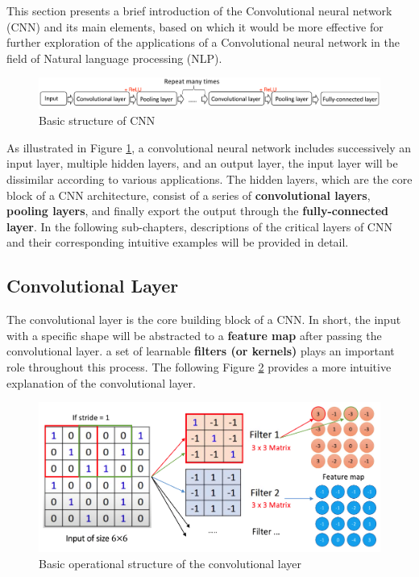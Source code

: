 \documentclass[]{krantz}
\begin{document}
This section presents a brief introduction of the Convolutional neural network (CNN) and its main elements, based on which it would be more effective for further exploration of the applications of a Convolutional neural network in the field of Natural language processing (NLP).

\begin{figure}[ht]

{\centering \includegraphics[width=1.05\linewidth]{figures/01-03-cnns-and-their-applications-in-nlp/basic_structure} 

}

\caption{Basic structure of CNN}\label{fig:figs}
\end{figure}

As illustrated in Figure \ref{fig:figs}, a convolutional neural network includes successively an input layer, multiple hidden layers, and an output layer, the input layer will be dissimilar according to various applications. The hidden layers, which are the core block of a CNN architecture, consist of a series of \textbf{convolutional layers}, \textbf{pooling layers}, and finally export the output through the \textbf{fully-connected layer}. In the following sub-chapters, descriptions of the critical layers of CNN and their corresponding intuitive examples will be provided in detail.

\hypertarget{convolutional-layer}{%
\subsection{Convolutional Layer}\label{convolutional-layer}}

The convolutional layer is the core building block of a CNN. In short, the input with a specific shape will be abstracted to a \textbf{feature map} after passing the convolutional layer. a set of learnable \textbf{filters (or kernels)} plays an important role throughout this process. The following Figure \ref{fig:figs-2} provides a more intuitive explanation of the convolutional layer.

\begin{figure}[ht]

{\centering \includegraphics[width=0.65\linewidth]{figures/01-03-cnns-and-their-applications-in-nlp/Matrix} 

}

\caption{Basic operational structure of the convolutional layer}\label{fig:figs-2}
\end{figure}
\end{document}
